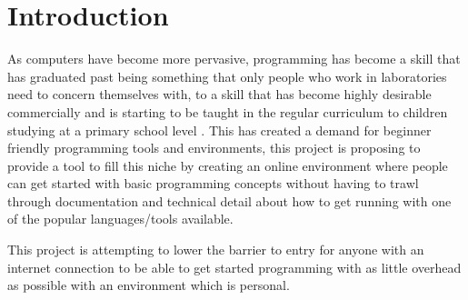 \chapter{Introduction}

As computers have become more pervasive, programming has become a skill that has graduated past being something that only people who work in laboratories need to concern themselves with, to a skill that has become highly desirable commercially and is starting to be taught in the regular curriculum to children studying at a primary school level \cite{schools}. This has created a demand for beginner friendly programming tools and environments, this project is proposing to provide a tool to fill this niche by creating an online environment where people can get started with basic programming concepts without having to trawl through documentation and technical detail about how to get running with one of the popular languages/tools available.

This project is attempting to lower the barrier to entry for anyone with an internet connection to be able to get started programming with as little overhead as possible with an environment which is personal.

\pagebreak
